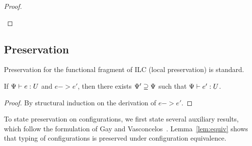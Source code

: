 \begin{theorem}[Progress]
\begin{proof}
\begin{itemize}[leftmargin=*]
\begin{llproof}




        
      \end{llproof}
    \end{itemize}    
\end{proof}  
\end{theorem}

\subsection{Preservation}

Preservation for the functional fragment of ILC (local preservation) is standard.

\begin{lemma}\label{lem:local-preservation}
  If $\Psi |- e : U$ and $e -> e'$, then there exists $\Psi' \supseteq \Psi$ such
  that $\Psi |- e' : U$.
  \begin{proof}
    By structural induction on the derivation of $e -> e'$.
  \end{proof}
\end{lemma}

To state preservation on configurations, we first state several auxiliary
results, which follow the formulation of Gay and
Vasconcelos~\cite{gay2010linear}.  Lemma~\ref{lem:equiv} shows that typing of
configurations is preserved under configuration equivalence.

